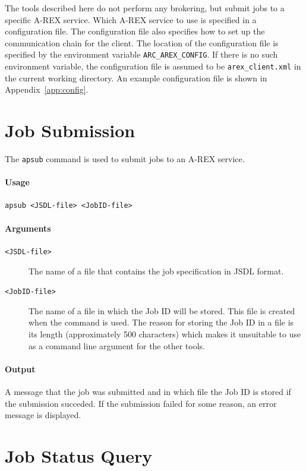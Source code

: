 \documentclass{article}                            %
\begin{document}
The tools described here do not perform any brokering, but submit jobs
to a specific A-REX service. Which A-REX service to use is specified
in a configuration file. The configuration file also specifies how to
set up the communication chain for the client. The location of the
configuration file is specified by the environment variable
\verb:ARC_AREX_CONFIG:. If there is no such environment variable, the
configuration file is assumed to be \verb:arex_client.xml: in the
current working directory. An example configuration file is shown in
Appendix~\ref{app:config}.


\section{Job Submission}
\label{sec:apsub}

The \verb#apsub# command is used to submit jobs to an A-REX service.

\begin{shaded}
\paragraph{Usage} \verb:apsub <JSDL-file> <JobID-file>:
\end{shaded}

\paragraph{Arguments}
\begin{description}
\item[\texttt{<JSDL-file>}] The name of a file that contains
the job specification in JSDL format.
\item[\texttt{<JobID-file>}] The name of a file in which the
Job ID will be stored. This file is created when the command is
used. The reason for storing the Job ID in a file is its length
(approximately 500 characters) which makes it unsuitable to use as a
command line argument for the other tools.
\end{description}

\paragraph{Output} A message that the job was submitted and in which
file the Job ID is stored if the submission succeded. If the
submission failed for some reason, an error message is displayed.


\section{Job Status Query}
\label{sec:apstat}
\end{document}
